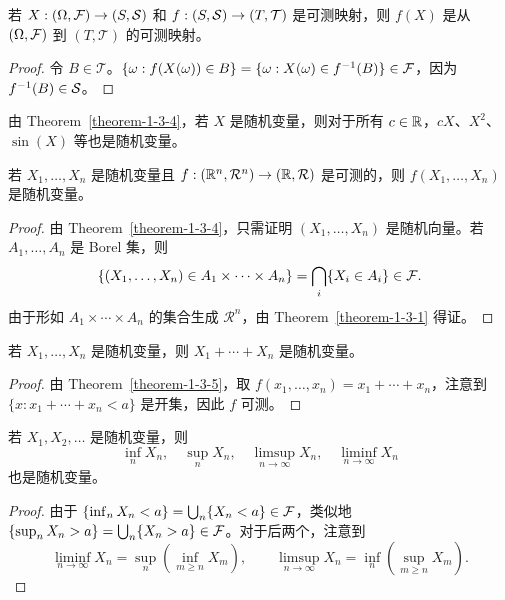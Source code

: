 \begin{theorem}\label{theorem-1-3-4}
    若 $X : (\Omega, \mathcal{F}) \to (S, \mathcal{S})$ 和 $f : (S, \mathcal{S}) \to (T, \mathcal{T})$ 是可测映射，则 $f(X)$ 是从 $(\Omega, \mathcal{F})$ 到 $(T, \mathcal{T})$ 的可测映射。
\end{theorem}

\begin{proof}
    令 $B \in \mathcal{T}$。$\{\omega : f(X(\omega)) \in B\} = \{\omega : X(\omega) \in f^{-1}(B)\} \in \mathcal{F}$，因为 $f^{-1}(B) \in \mathcal{S}$。
\end{proof}

由 Theorem~\ref{theorem-1-3-4}，若 $X$ 是随机变量，则对于所有 $c \in \mathbb{R}$，$cX$、$X^2$、$\sin(X)$ 等也是随机变量。

\begin{theorem}\label{theorem-1-3-5}
    若 $X_1, \dots, X_n$ 是随机变量且 $f : (\mathbb{R}^n, \mathcal{R}^n) \to (\mathbb{R}, \mathcal{R})$ 是可测的，则 $f(X_1, \dots, X_n)$ 是随机变量。
\end{theorem}

\begin{proof}
    由 Theorem~\ref{theorem-1-3-4}，只需证明 $(X_1, \dots, X_n)$ 是随机向量。若 $A_1, \dots, A_n$ 是 Borel 集，则
    \[
        \{(X_1, \dots, X_n) \in A_1 \times \cdots \times A_n\} = \bigcap_i \{X_i \in A_i\} \in \mathcal{F}.
    \]
    由于形如 $A_1 \times \cdots \times A_n$ 的集合生成 $\mathcal{R}^n$，由 Theorem~\ref{theorem-1-3-1} 得证。
\end{proof}

\begin{corollary}
    若 $X_1, \dots, X_n$ 是随机变量，则 $X_1 + \cdots + X_n$ 是随机变量。
\end{corollary}

\begin{proof}
    由 Theorem~\ref{theorem-1-3-5}，取 $f(x_1,\dots,x_n) = x_1 + \cdots + x_n$，注意到 $\{x : x_1 + \cdots + x_n < a\}$ 是开集，因此 $f$ 可测。
\end{proof}

\begin{theorem}\label{theorem-1-3-7}
    若 $X_1, X_2, \dots$ 是随机变量，则
    \[
        \inf_n X_n, \quad \sup_n X_n, \quad \limsup_{n \to \infty} X_n, \quad \liminf_{n \to \infty} X_n
    \]
    也是随机变量。
\end{theorem}

\begin{proof}
    由于 $\{\inf_n X_n < a\} = \bigcup_n \{X_n < a\} \in \mathcal{F}$，类似地 $\{\sup_n X_n > a\} = \bigcup_n \{X_n > a\} \in \mathcal{F}$。对于后两个，注意到
    \[
        \liminf_{n \to \infty} X_n = \sup_n \left( \inf_{m \ge n} X_m \right),
        \qquad
        \limsup_{n \to \infty} X_n = \inf_n \left( \sup_{m \ge n} X_m \right).
    \]
\end{proof}

